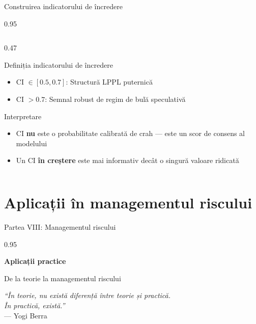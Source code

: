 \documentclass[9pt, aspectratio=169, t]{beamer}
\begin{document}
\begin{frame}{Construirea indicatorului de încredere}
\begin{cminipage}{0.95\textwidth}
{\begin{columns}[T]
\begin{column}{0.47\textwidth}
\begin{block}{Definiția indicatorului de încredere}
\begin{itemize}
                    \item CI $\in [0.5, 0.7]$: Structură LPPL puternică
                    \item CI $> 0.7$: Semnal robust de regim de bulă speculativă
                \end{itemize}
            \end{block}
            \vspace{-1mm}
            \begin{block}{Interpretare}
                \begin{itemize}\setlength{\itemsep}{0pt}
                    \item CI \textbf{nu} este o probabilitate calibrată de crah --- este un scor de consens al modelului
                    \item Un CI \textbf{în creștere} este mai informativ decât o singură valoare ridicată
                \end{itemize}
            \end{block}
        \end{column}
    \end{columns}
    }
    \end{cminipage}
\end{frame}

\section{Aplicații în managementul riscului}

\begin{frame}{Partea VIII: Managementul riscului}
    \begin{cminipage}{0.95\textwidth}
    \begin{center}
        {\LARGE\color{MainBlue}\textbf{Aplicații practice}}

        \vspace{8mm}
        {\large De la teorie la managementul riscului}

        \vspace{8mm}
        \textit{``În teorie, nu există diferență între teorie și practică.\\În practică, există.''}\\
        --- Yogi Berra
    \end{center}
    \end{cminipage}
\end{frame}
\end{document}
